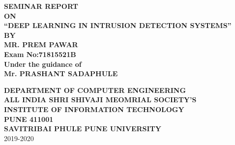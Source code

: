 \documentclass[12pt]{report}	%
\begin{document}

	\begin{titlepage}   
		\thisfancypage{\setlength{\fboxsep}{10pt}\doublebox}{}
		\vspace*{0.1in}
		\begin{center}
		{ \bf { SEMINAR REPORT \\ ON}}\\
		\vspace{0.2in}
		{\Large \bf {``DEEP LEARNING IN INTRUSION DETECTION SYSTEMS''}}
		\\
		\vspace{0.2in}
		{\bf BY}\\
		\vspace{0.1in}
		{\bf MR. PREM PAWAR} \\ {\bf Exam No:71815521B  }\\
		\vspace{0.2in}
		{\bf Under the guidance of}\\
		\vspace{0.1in}
		{\large \bf Mr. PRASHANT SADAPHULE}\\
		\vspace{0.1in}
		\begin{figure}[h]
		\centerline{}
		\label{atcres}
		\end{figure}
		{ \bf{ DEPARTMENT OF COMPUTER ENGINEERING}}\\ 
		\vspace{0.2in}
		{ \bf ALL INDIA SHRI SHIVAJI MEOMRIAL SOCIETY'S \\
		{\large \bf INSTITUTE OF INFORMATION TECHNOLOGY }}\\ 
		{\bf \small PUNE 411001 }\\ 
		\vspace{0.2in}
		{ \bf SAVITRIBAI PHULE PUNE UNIVERSITY} \\
		\small{2019-2020}
		\end{center}
	\end{titlepage}
	\thisfancypage{\setlength{\fboxsep}{10pt}\doublebox}{}	
	
\end{document}

